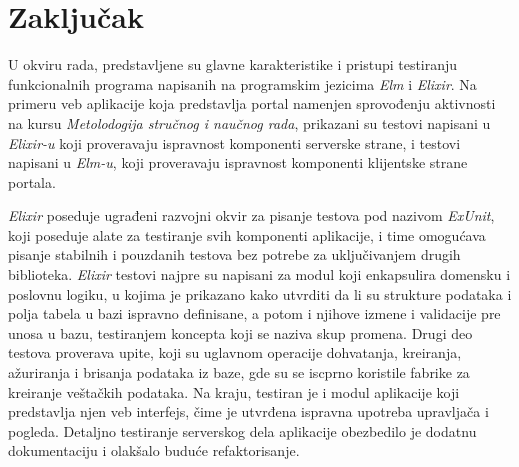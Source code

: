 \documentclass[12pt,oneside]{memoir}
\begin{document}



\chapter{Zaključak}
\label{chp:zakljucak}
\par U okviru rada, predstavljene su glavne karakteristike i pristupi testiranju funkcionalnih programa napisanih na programskim jezicima \emph{Elm} i \emph{Elixir}. Na primeru veb aplikacije koja predstavlja portal namenjen sprovođenju aktivnosti na kursu \emph{Metolodogija stručnog i naučnog rada}, prikazani su testovi napisani u \emph{Elixir-u} koji proveravaju ispravnost komponenti serverske strane, i testovi napisani u \emph{Elm-u}, koji proveravaju ispravnost komponenti klijentske strane portala.
\par \emph{Elixir} poseduje ugrađeni razvojni okvir za pisanje testova pod nazivom \emph{ExUnit}, koji poseduje alate za testiranje svih komponenti aplikacije, i time omogućava pisanje stabilnih i pouzdanih testova bez potrebe za uključivanjem drugih biblioteka. \emph{Elixir} testovi najpre su napisani za modul koji enkapsulira domensku i poslovnu logiku, u kojima je prikazano kako utvrditi da li su strukture podataka i polja tabela u bazi ispravno definisane, a potom i njihove izmene i validacije pre unosa u bazu, testiranjem koncepta koji se naziva skup promena. Drugi deo testova proverava upite, koji su uglavnom operacije dohvatanja, kreiranja, ažuriranja i brisanja podataka iz baze, gde su se iscprno koristile fabrike za kreiranje veštačkih podataka. Na kraju, testiran je i modul aplikacije koji predstavlja njen veb interfejs, čime je utvrđena ispravna upotreba upravljača i pogleda. Detaljno testiranje serverskog dela aplikacije obezbedilo je dodatnu dokumentaciju i olakšalo buduće refaktorisanje.
\end{document}
